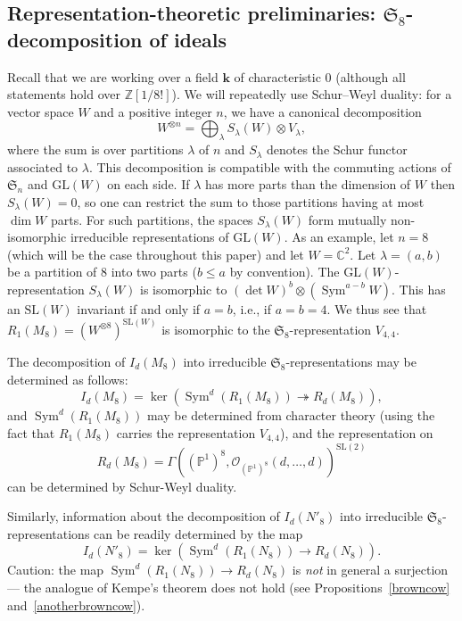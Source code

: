 \documentclass{amsart}
\theoremstyle{definition}
\theoremstyle{remark}
\DeclareMathOperator{\Sym}{Sym}
\def\GL{\mathrm{GL}}
\def\SL{\mathrm{SL}}
\def\SS{\mathfrak{S}}
\def\fieldk{\mathbf{k}}
\def\Z{\mathbb{Z}}
\def\proj{\mathbb{P}}
\def\C{\mathbb{C}}
\def\oh{\mathcal{O}}
\begin{document}
\subsection{Representation-theoretic preliminaries: $\SS_8$-decomposition of ideals}
\label{ss:p2}

Recall that we are working over a field $\fieldk$ of characteristic
$0$ (although all statements hold over $\Z[1/8!]$).
We will repeatedly use Schur--Weyl duality:  for a vector space $W$ and a positive integer $n$, we have a canonical
decomposition
\begin{displaymath}
W^{\otimes n}=\bigoplus_{\lambda} S_{\lambda}(W) \otimes V_{\lambda},
\end{displaymath}
where the sum is over partitions $\lambda$ of $n$ and $S_{\lambda}$ denotes the Schur functor associated to $\lambda$.
This decomposition is compatible with the commuting actions of $\SS_n$ and $\GL(W)$ on each side.  If $\lambda$ has
more parts than the dimension of $W$ then $S_{\lambda}(W)=0$, so one can restrict the sum to those partitions having at
most $\dim{W}$ parts.  For such partitions, the spaces $S_{\lambda}(W)$ form mutually non-isomorphic irreducible
representations of $\GL(W)$. As an example, let $n=8$ (which will be the case throughout this paper) and let $W=\C^2$.
Let $\lambda=(a,b)$ be a partition of 8 into two parts ($b \le a$ by convention).  The $\GL(W)$-representation
$S_{\lambda}(W)$ is isomorphic to $(\det W)^b \otimes (\Sym^{a-b} W)$.  This has an $\SL(W)$ invariant if and only if
$a=b$, i.e., if $a=b=4$.  We thus see that $R_1(M_8) = (W^{\otimes 8})^{\SL(W)}$ is isomorphic to the
$\SS_8$-representation $V_{4,4}$.

The decomposition of $I_d(M_8)$ into irreducible $\SS_8$-representations may be determined as follows:
\begin{displaymath}
I_d(M_8) = \ker( \Sym^d (R_1(M_8)) \twoheadrightarrow R_d(M_8)),
\end{displaymath}
and $\Sym^d(R_1(M_8))$ may be determined from character theory (using the fact that $R_1(M_8)$ carries the
representation $V_{4,4}$), and the representation on
\begin{displaymath}
R_d(M_8) = \Gamma( (\proj^1)^8, \oh_{(\proj^1)^8}(d, \dots, d))^{\SL(2)}
\end{displaymath}
can be determined by Schur-Weyl duality. 

Similarly, information about the decomposition of $I_d(N'_8)$ into irreducible $\SS_8$-representations can be readily
determined by the map
\begin{displaymath}
I_d(N'_8) = \ker( \Sym^d (R_1(N_8)) \to R_d(N_8)).
\end{displaymath}
Caution: the map $\Sym^d (R_1(N_8)) \to R_d(N_8)$ is \emph{not} in general a surjection --- the analogue of Kempe's
theorem does not hold (see  Propositions~\ref{browncow} and~\ref{anotherbrowncow}).
\end{document}
